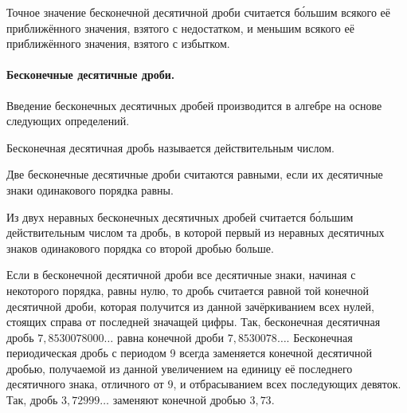 \documentclass[oneside]{book}
\begin{document}
Точное значение бесконечной десятичной дроби считается б\'{о}ль\-шим всякого её приближённого значения, взятого с недостатком, и меньшим всякого её приближённого значения, взятого с избытком. %

\paragraph{Бесконечные десятичные дроби.}\label{1938/151}
Введение бесконечных десятичных дробей производится в алгебре на основе следующих определений.

Бесконечная десятичная дробь называется действительным числом.

Две бесконечные десятичные дроби считаются равными, если их десятичные знаки одинакового порядка равны.

Из двух неравных бесконечных десятичных дробей считается б\'{о}льшим действительным числом та дробь, в которой первый из неравных десятичных знаков одинакового порядка со второй дробью %
больше.

Если в бесконечной десятичной дроби все десятичные знаки, начиная с некоторого порядка, равны нулю, то дробь считается равной той конечной десятичной дроби, которая получится из данной зачёркиванием всех нулей, стоящих справа от последней значащей цифры.
Так, бесконечная десятичная дробь $7{,}8530078000\dots$
равна конечной дроби $7{,}8530078\dots$.
Бесконечная периодическая дробь с периодом 9 всегда заменяется конечной десятичной дробью, получаемой из данной увеличением на единицу её последнего десятичного знака, отличного от $9$, и отбрасыванием всех последующих девяток.
Так, дробь $3{,}72999\dots$ заменяют конечной дробью $3{,}73$.
\end{document}
